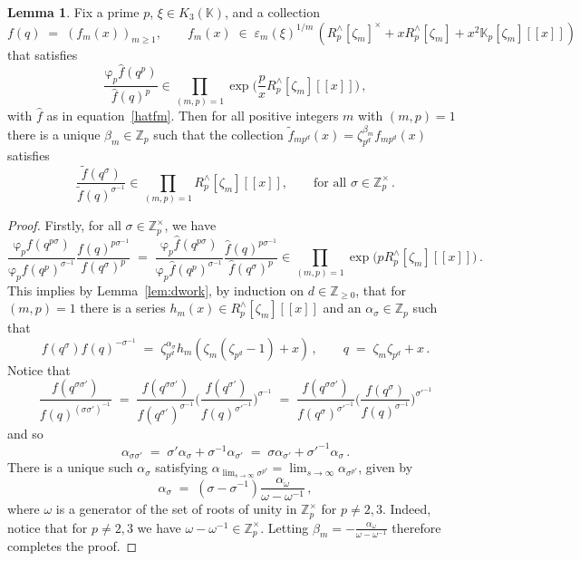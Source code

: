 \documentclass[12pt,reqno]{amsart}
\theoremstyle{definition}
\newtheorem{lemma}[proposition]{Lemma}
\def\BZ{\mathbb Z}
\def\BK{\mathbb K}
\def\be{\begin{equation}}
\def\ee{\end{equation}}
\def\z{\zeta}
\def\={\;=\;}
\def\inn{\;\in\;}
\def\fr{\mathrm{\varphi}_p}
\begin{document}
\begin{lemma}
\label{lem:ftild}
Fix a prime $p$, $\xi \in K_3(\BK)$, and a collection
\be
f(q) \=(f_{m}(x))_{m\geq1}, \qquad
f_{m}(x)\inn \varepsilon_{m}(\xi)^{1/m}\,
(R^\wedge_p[\z_m]^{\times} +xR_p^\wedge[\z_m]+x^2\BK_p[\z_m][\![x]\!])
\ee
that satisfies
\be
\frac{\fr \widehat{f}(q^p)}{\widehat{f}(q)^p}
\in\!\!\prod_{(m,p)=1}\exp\Big(\frac{p}{x}R^\wedge_p[\z_m][\![x]\!]\Big)\,,
\ee
with $\widehat{f}$ as in equation~\eqref{hatfm}.
Then for all positive integers $m$ with $(m,p)=1$ there is a unique
$\beta_m\in\BZ_{p}$ such that the collection
$\widetilde{f}_{mp^d}(x)=\z_{p^d}^{\beta_m}f_{mp^d}(x)$ satisfies
\be
\frac{\widetilde{f}(q^{\sigma})}{\widetilde{f}(q)^{\sigma^{-1}}}
\in\!\!\prod_{(m,p)=1}R^\wedge_p[\z_m][\![x]\!],\qquad
\text{for all }\sigma\in\BZ_p^{\times}\,.
\ee
\end{lemma}

\begin{proof}
Firstly, for all $\sigma\in\BZ_{p}^{\times}$, we have
\be
\frac{\fr f(q^{p\sigma})}{\fr f(q^p)^{\sigma^{-1}}}
\frac{f(q)^{p\sigma^{-1}}}{f(q^{\sigma})^p}
\=
\frac{\fr \widehat{f}(q^{p\sigma})}{\fr \widehat{f}(q^p)^{\sigma^{-1}}}
\frac{\widehat{f}(q)^{p\sigma^{-1}}}{\widehat{f}(q^{\sigma})^p}
\in
\!\!\prod_{(m,p)=1}\exp\big(pR^\wedge_p[\z_m][\![x]\!]\big)\,.
\ee
This implies by Lemma~\ref{lem:dwork}, by induction on $d\in\BZ_{\geq0}$, that
for $(m,p)=1$ there is a series $h_m(x)\in R^\wedge_p[\z_m][\![x]\!]$ and an
$\alpha_\sigma\in\BZ_p$ such that
\be
f(q^{\sigma})f(q)^{-\sigma^{-1}}
\=
\z_{p^d}^{\alpha_\sigma}
h_{m}(\z_{m}(\z_{p^d}-1)+x)\,,
\qquad
q\=\z_{m}\z_{p^d}+x\,.
\ee
Notice that
\be
\frac{f(q^{\sigma\sigma'})}{f(q)^{(\sigma\sigma')^{-1}}}
\=
\frac{f(q^{\sigma\sigma'})}{f(q^{\sigma'})^{\sigma^{-1}}}
\Big(\frac{f(q^{\sigma'})}{f(q)^{\sigma'^{-1}}}\Big)^{\sigma^{-1}}
\=
\frac{f(q^{\sigma\sigma'})}{f(q^{\sigma})^{\sigma'^{-1}}}
\Big(\frac{f(q^{\sigma})}{f(q)^{\sigma^{-1}}}\Big)^{\sigma'^{-1}}
\ee
and so
\be
\alpha_{\sigma\sigma'}
\=
\sigma'\alpha_\sigma+\sigma^{-1}\alpha_{\sigma'}
\=
\sigma\alpha_{\sigma'}+\sigma'^{-1}\alpha_{\sigma}\,.
\ee
There is a unique such $\alpha_\sigma$ satisfying
$\alpha_{\lim_{s\rightarrow\infty}\sigma^{p^{s}}}
=\lim_{s\rightarrow\infty}\alpha_{\sigma^{p^{s}}}$, given by
\be
\alpha_{\sigma} \=
(\sigma-\sigma^{-1})\frac{\alpha_\omega}{\omega-\omega^{-1}}\,,
\ee
where $\omega$ is a generator of the set of roots of unity in $\BZ_p^{\times}$ for
$p\neq 2,3$. Indeed, notice that for $p\neq 2,3$ we have
$\omega-\omega^{-1}\in\BZ_p^{\times}$. Letting
$\beta_m=-\frac{\alpha_{\omega}}{\omega-\omega^{-1}}$ therefore completes the proof.
\end{proof}
\end{document}
